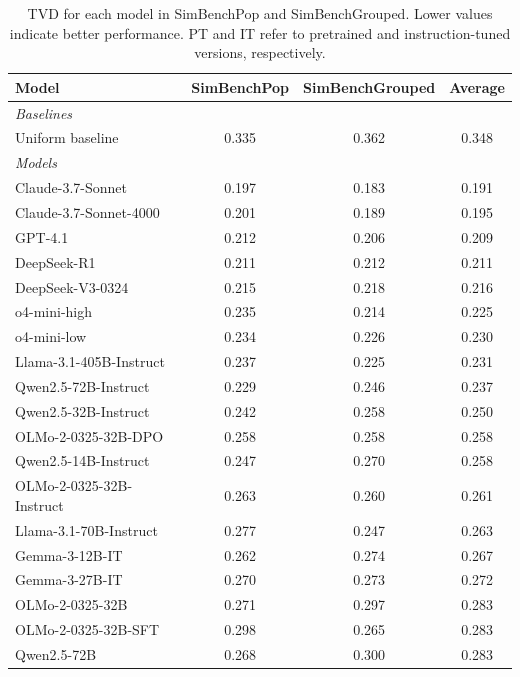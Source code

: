 \documentclass{article} %
\begin{document}
\begin{table}[!ht]
\caption{TVD for each model in SimBenchPop and SimBenchGrouped. Lower values indicate better performance. PT and IT refer to pretrained and instruction-tuned versions, respectively.}
\label{tab:total_variation_full}
\centering
\small %
\renewcommand{\arraystretch}{1.15} %
\begin{tabular}{l|cc|c}
\toprule
\textbf{Model} & \textbf{SimBenchPop} & \textbf{SimBenchGrouped} & \textbf{Average} \\
\midrule
\multicolumn{4}{l}{\textit{Baselines}} \\
\midrule
Uniform baseline & 0.335 & 0.362 & 0.348 \\
\midrule
\multicolumn{4}{l}{\textit{Models}} \\
\midrule
\rowcolor[HTML]{EFEFEF}
Claude-3.7-Sonnet & 0.197 & 0.183 & 0.191 \\
Claude-3.7-Sonnet-4000 & 0.201 & 0.189 & 0.195 \\
\rowcolor[HTML]{EFEFEF}
GPT-4.1 & 0.212 & 0.206 & 0.209 \\
DeepSeek-R1 & 0.211 & 0.212 & 0.211 \\
\rowcolor[HTML]{EFEFEF}
DeepSeek-V3-0324 & 0.215 & 0.218 & 0.216 \\
o4-mini-high & 0.235 & 0.214 & 0.225 \\
\rowcolor[HTML]{EFEFEF}
o4-mini-low & 0.234 & 0.226 & 0.230 \\
Llama-3.1-405B-Instruct & 0.237 & 0.225 & 0.231 \\
\rowcolor[HTML]{EFEFEF}
Qwen2.5-72B-Instruct & 0.229 & 0.246 & 0.237 \\
Qwen2.5-32B-Instruct & 0.242 & 0.258 & 0.250 \\
\rowcolor[HTML]{EFEFEF}
OLMo-2-0325-32B-DPO & 0.258 & 0.258 & 0.258 \\
Qwen2.5-14B-Instruct & 0.247 & 0.270 & 0.258 \\
\rowcolor[HTML]{EFEFEF}
OLMo-2-0325-32B-Instruct & 0.263 & 0.260 & 0.261 \\
Llama-3.1-70B-Instruct & 0.277 & 0.247 & 0.263 \\
\rowcolor[HTML]{EFEFEF}
Gemma-3-12B-IT & 0.262 & 0.274 & 0.267 \\
Gemma-3-27B-IT & 0.270 & 0.273 & 0.272 \\
\rowcolor[HTML]{EFEFEF}
OLMo-2-0325-32B & 0.271 & 0.297 & 0.283 \\
OLMo-2-0325-32B-SFT & 0.298 & 0.265 & 0.283 \\
\rowcolor[HTML]{EFEFEF}
Qwen2.5-72B & 0.268 & 0.300 & 0.283 \\

\end{tabular}
\end{table}
\end{document}
